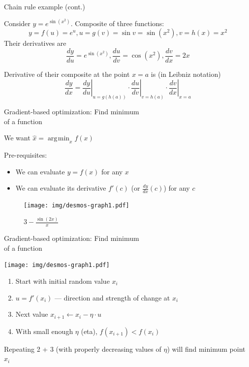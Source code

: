 \documentclass[12pt,aspectratio=169,handout]{beamer}
\DeclareMathOperator*{\argmin}{arg\!\min}
\begin{document}
\begin{frame}{Chain rule example (cont.)}
	
	Consider $y=e^{\sin(x^{2})}$. Composite of three functions:
	$$y = f(u) = e^u, u = g(v) = \sin v = \sin (x^2), v = h(x) = x^2$$
	Their derivatives are
	$$\frac{dy}{du} = e^{\sin(x^{2})}, \frac{du}{dv} = \cos (x^2), \frac{dv}{dx} = 2x$$
	
	\pause
	
	Derivative of their composite at the point $x = a$ is (in Leibniz notation)
	$$
	{\frac {dy}{dx}}=\left.{\frac {dy}{du}}\right|_{u=g(h(a))}\cdot \left.{\frac {du}{dv}}\right|_{v=h(a)}\cdot \left.{\frac {dv}{dx}}\right|_{x=a}
	$$
	
\end{frame}


\begin{frame}{Gradient-based optimization: Find minimum\\ of a function}
	
	We want $\hat{x} = \argmin_x f(x)$
	
	Pre-requisites:
	
	\begin{itemize}
		\item We can evaluate $y = f(x)$ for any $x$
		\item We can evaluate its derivative $f'(c)$ (or $\frac{dy}{dx}(c)$) for any $c$
	\end{itemize}
	
	\begin{figure}
		\texttt{[image: img/desmos-graph1.pdf]}	
		\caption{$3-\frac{\sin\left(2x\right)}{x}$}
	\end{figure}
	
\end{frame}


\begin{frame}{Gradient-based optimization: Find minimum\\ of a function}
	
	\texttt{[image: img/desmos-graph1.pdf]}
	
	
	\begin{enumerate}
		\item Start with initial random value $x_i$
		\item $u = f'(x_i)$ --- direction and strength of change at $x_i$
		\item Next value $x_{i + 1} \gets x_i - \eta \cdot u$
		\item With small enough $\eta$ (eta), $f(x_{i+1}) < f(x_i)$
	\end{enumerate}
	Repeating 2 + 3 (with properly decreasing values of $\eta$) will find minimum point $x_i$
	
	
	
\end{frame}
\end{document}
